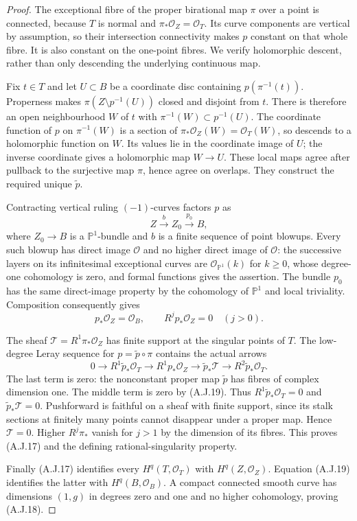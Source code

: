 \begin{proof}
The exceptional fibre of the proper birational map $\pi$
over a point is connected, because $T$ is normal and
$\pi_*\mathcal O_Z=\mathcal O_T$. Its curve components
are vertical by assumption, so their intersection
connectivity makes $p$ constant on that whole fibre.
It is also constant on the one-point fibres. We verify
holomorphic descent, rather than only descending the
underlying continuous map.

Fix $t\in T$ and let $U\subset B$ be a coordinate disc
containing $p(\pi^{-1}(t))$. Properness makes
$\pi(Z\setminus p^{-1}(U))$ closed and disjoint from
$t$. There is therefore an open neighbourhood $W$ of $t$
with $\pi^{-1}(W)\subset p^{-1}(U)$. The coordinate
function of $p$ on $\pi^{-1}(W)$ is a section of
$\pi_*\mathcal O_Z(W)=\mathcal O_T(W)$, so descends
to a holomorphic function on $W$. Its values lie in the
coordinate image of $U$; the inverse coordinate gives a
holomorphic map $W\to U$. These local maps agree after
pullback to the surjective map $\pi$, hence agree on
overlaps. They construct the required unique
$\widetilde p$.

Contracting vertical ruling $(-1)$-curves factors $p$ as
\[
 Z\xrightarrow{b} Z_0\xrightarrow{p_0}B,
\]
where $Z_0\to B$ is a $\mathbb P^1$-bundle and $b$
is a finite sequence of point blowups. Every such blowup
has direct image $\mathcal O$ and no higher direct image
of $\mathcal O$: the successive layers on its
infinitesimal exceptional curves are
$\mathcal O_{\mathbb P^1}(k)$ for $k\geq0$, whose
degree-one cohomology is zero, and formal functions gives
the assertion. The bundle $p_0$ has the same direct-image
property by the cohomology of $\mathbb P^1$ and local
triviality. Composition consequently gives
\[
 p_*\mathcal O_Z=\mathcal O_B,
 \qquad R^j p_*\mathcal O_Z=0\quad(j>0).          \tag{A.J.19}
\]

The sheaf $\mathcal T=R^1\pi_*\mathcal O_Z$ has
finite support at the singular points of $T$. The
low-degree Leray sequence for $p=\widetilde p\circ\pi$
contains the actual arrows
\[
 0\longrightarrow R^1\widetilde p_*\mathcal O_T
 \longrightarrow R^1p_*\mathcal O_Z
 \longrightarrow\widetilde p_*\mathcal T
 \longrightarrow R^2\widetilde p_*\mathcal O_T.    \tag{A.J.20}
\]
The last term is zero: the nonconstant proper map
$\widetilde p$ has fibres of complex dimension one.
The middle term is zero by (A.J.19). Thus
$R^1\widetilde p_*\mathcal O_T=0$ and
$\widetilde p_*\mathcal T=0$. Pushforward is faithful
on a sheaf with finite support, since its stalk sections
at finitely many points cannot disappear under a proper
map. Hence $\mathcal T=0$. Higher $R^j\pi_*$ vanish
for $j>1$ by the dimension of its fibres. This proves
(A.J.17) and the defining rational-singularity property.

Finally (A.J.17) identifies every
$H^q(T,\mathcal O_T)$ with $H^q(Z,\mathcal O_Z)$.
Equation (A.J.19) identifies the latter with
$H^q(B,\mathcal O_B)$. A compact connected smooth curve
has dimensions $(1,g)$ in degrees zero and one and no
higher cohomology, proving (A.J.18).
\end{proof}

